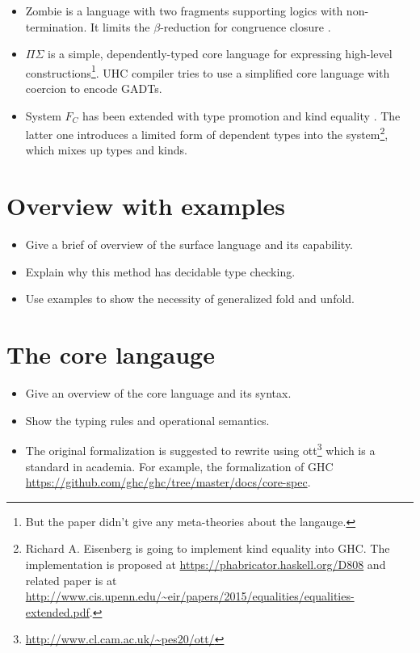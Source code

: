 \documentclass[preprint]{sigplanconf}
\begin{document}
\begin{enumerate}[a)]
\begin{itemize}
\item \textsf{Zombie} \cite{zombie:popl14, zombie:thesis} is a language with two fragments supporting logics with non-termination. It limits the $\beta$-reduction for congruence closure \cite{zombie:popl15}.

\item $\Pi\Sigma$ \cite{dep:pisigma} is a simple, dependently-typed core language for expressing high-level constructions\footnote{But the paper didn't give any meta-theories about the langauge.}. UHC compiler \cite{fc:uhc} tries to use a simplified core language with coercion to encode GADTs.

\item System $F_C$ \cite{fc} has been extended with type promotion \cite{fc:pro} and kind equality \cite{fc:kind}. The latter one introduces a limited form of dependent types into the system\footnote{Richard A. Eisenberg is going to implement kind equality \cite{fc:kind} into GHC. The implementation is proposed at \url{https://phabricator.haskell.org/D808} and related paper is at \url{http://www.cis.upenn.edu/~eir/papers/2015/equalities/equalities-extended.pdf}.}, which mixes up types and kinds.
\end{itemize}

\end{enumerate}

\section{Overview with examples}
\begin{itemize}
\item Give a brief of overview of the surface language and its capability.
\item Explain why this method has decidable type checking.
\item Use examples to show the necessity of generalized \textsf{fold} and \textsf{unfold}.
\end{itemize}

\section{The core langauge}
\begin{itemize}
\item Give an overview of the core language and its syntax.
\item Show the typing rules and operational semantics.
\item The original formalization is suggested to rewrite using \textsf{ott}\footnote{\url{http://www.cl.cam.ac.uk/~pes20/ott/}} which is a standard in academia. For example, the formalization of GHC \url{https://github.com/ghc/ghc/tree/master/docs/core-spec}.
\end{itemize}
\end{document}
